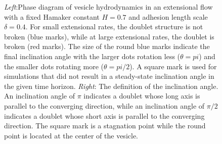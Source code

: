 \documentclass[prf,superscriptaddress,showpacs]{revtex4-1}
\begin{document}
\begin{figure}[htp]
\begin{minipage}{0.33\textwidth}
  \end{minipage}
  \caption{\label{fig:extensionalPhaseDiagram} {\em Left}:Phase diagram
  of vesicle hydrodynamics in an extensional flow with a fixed Hamaker
  constant $H=0.7$ and adhesion length scale $\delta = 0.4$.  For small
  extensional rates, the doublet structure is not broken (blue marks),
  while at large extensional rates, the doublet is broken (red marks).
  The size of the round blue marks indicate the final inclination angle
  with the larger dots rotation less ($\theta=pi$) and the smaller dots
  rotating more ($\theta = pi/2$).  A square mark is used for
  simulations that did not result in a steady-state inclination angle in
  the given time horizon.  {\em Right}: The definition of the
  inclination angle.  An inclination angle of $\pi$ indicates a doublet
  whose long axis is parallel to the converging direction, while an
  inclination angle of $\pi/2$ indicates a doublet whose short axis is
  parallel to the converging direction.  The square mark is a stagnation
  point while the round point is located at the center of the vesicle.}
\end{figure}

\end{document}
